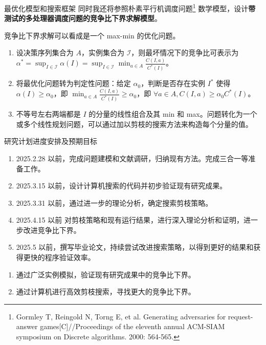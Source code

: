 \begin{frame}{最优化模型和搜索框架}{}
    同时我还将参照朴素平行机调度问题\footnote{Gormley T, Reingold N, Torng E, et al. Generating adversaries for request-answer games[C]//Proceedings of the eleventh annual ACM-SIAM symposium on Discrete algorithms. 2000: 564-565.} 数学模型，设计\textbf{带测试的多处理器调度问题的竞争比下界求解模型}。

    竞争比下界求解可以看成是一个 max-min 的优化问题。

    \begin{enumerate}
        \item 设决策序列集合为 $A$，实例集合为 $\mathcal{I}$，则最坏情况下的竞争比可表示为 $\alpha^* = \sup_{I \in \mathcal{I}} \alpha(I)=\sup_{I \in \mathcal{I}}\min_{a\in A}\frac{C(I,a)}{C^*(I)}$。
        \item 将最优化问题转为判定性问题：给定 $\alpha_0$，判断是否存在实例 $I^*$ 使得 $\alpha(I)\geq \alpha_0$，即 $\min_{a\in A} \frac{C(I,a)}{C^*(I)}\geq \alpha_0$，即 $\forall a\in A, C(I,a)\geq \alpha_0C^*(I)$。
        \item 不等号左右两端都是 $I$ 的分量的线性组合及其 min 和 max。问题转化为一个或多个线性规划问题，可以通过加以剪枝的搜索方法来构造每个分量的值。
    \end{enumerate}
\end{frame}

\begin{frame}{研究计划进度安排及预期目标}{}
    \begin{enumerate}
        \item 2025.2.28 以前，完成问题建模和文献调研，归纳现有方法。完成三合一等准备工作。
        \item 2025.3.15 以前，设计计算机搜索的代码并初步验证现有研究成果。
        \item 2025.3.31 以前，通过进一步的理论分析，确定搜索剪枝策略。
        \item 2025.4.15 以前 对剪枝策略和现有运行结果，进行深入理论分析和证明，进一步改进竞争比下界。
        \item 2025.5 以前，撰写毕业论文，持续尝试改进搜索策略，以得到更好的结果和获得更快的程序验证效率。
    \end{enumerate}
    \begin{enumerate}
        \item 通过广泛实例模拟，验证现有研究成果中的竞争比下界。
        \item 通过计算机进行高效剪枝搜索，寻找更大的竞争比下界。
    \end{enumerate}
\end{frame}